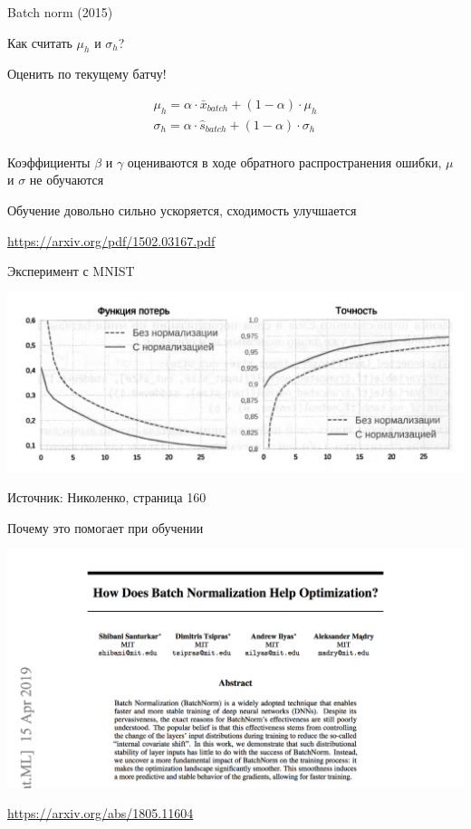 \documentclass[notes,12pt, aspectratio=169]{beamer}
\newenvironment{wideitemize}{\itemize\addtolength{\itemsep}{10pt}}{\enditemize}
\begin{document}
\begin{frame}{Batch norm (2015)}
\begin{wideitemize}
	\item  Как считать $\mu_h$ и $\sigma_h$? 
	
	\item Оценить по текущему батчу! 
	
	\begin{align*} 
	\mu_h =  \alpha \cdot \bar x_{batch}  + (1 - \alpha) \cdot \mu_h \\ 
	\sigma_h =  \alpha \cdot \hat s_{batch}  + (1 - \alpha) \cdot \sigma_h \\ 
	\end{align*}
	
	\item Коэффициенты $\beta$ и $\gamma$ оцениваются в ходе обратного распространения ошибки, $\mu$ и $\sigma$ не обучаются
	
	\item Обучение довольно сильно ускоряется, сходимость улучшается 
\end{wideitemize}

\vfill %
\footnotesize
{\color{blue} \url{https://arxiv.org/pdf/1502.03167.pdf}}
\end{frame}

\begin{frame}{Эксперимент с MNIST}
\begin{center}
	\includegraphics[width=.8\linewidth]{batch_norm.png}
\end{center}
\vfill
{\small  Источник: Николенко, страница 160}
\end{frame}


\begin{frame}{Почему это помогает при обучении}
\begin{center}
	\includegraphics[width=.8\linewidth]{how_bn_help.png}
\end{center}
\vfill
\footnotesize
{\color{blue} \url{https://arxiv.org/abs/1805.11604}}
\end{frame}
\end{document}
